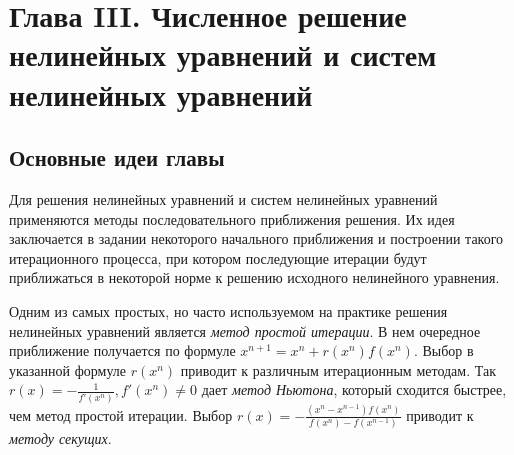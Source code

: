 \newpage
{}
\pagestyle{empty}
\vspace{0.5cm}


\section*{Глава III. Численное решение нелинейных уравнений и систем нелинейных уравнений}

\subsection{Основные идеи главы} 
 
Для решения нелинейных уравнений и систем нелинейных уравнений применяются методы последовательного приближения решения. Их идея заключается в задании некоторого начального приближения и построении такого итерационного процесса, при котором последующие итерации будут приближаться в некоторой норме к решению исходного нелинейного уравнения.
 
Одним из самых простых, но часто используемом на практике решения нелинейных уравнений является \textit{метод простой итерации}. В нем очередное приближение получается по формуле 
\begin{math} x^{n + 1} = x^n + r(x^n)f(x^n) \end{math}. 
Выбор в указанной формуле $r(x^n)$ приводит к различным итерационным методам. Так \begin{math} r(x) = -\frac{1}{f'(x^n)}, f'(x^n) \neq 0 \end{math} дает \textit{метод Ньютона}, который сходится быстрее, чем метод простой итерации.
Выбор \begin{math} r(x) = - \frac{(x^n - x^{n - 1})f(x^n)}{f(x^n) - f(x^{n - 1})} \end{math} приводит к \textit{методу секущих}.

